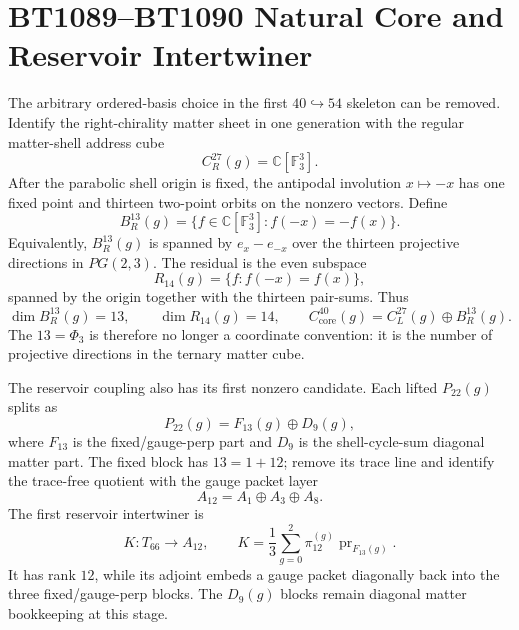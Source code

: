 \section{BT1089--BT1090 Natural Core and Reservoir Intertwiner}
\label{sec:bt1089-bt1090-natural-core-intertwiner}

The arbitrary ordered-basis choice in the first $40\hookrightarrow54$ skeleton can be removed.  Identify the right-chirality matter sheet in one generation with the regular matter-shell address cube
\[
C^{27}_R(g)=\mathbb C[\mathbb F_3^3].
\]
After the parabolic shell origin is fixed, the antipodal involution $x\mapsto -x$ has one fixed point and thirteen two-point orbits on the nonzero vectors.  Define
\[
B^{13}_R(g)=\{f\in\mathbb C[\mathbb F_3^3]: f(-x)=-f(x)\}.
\]
Equivalently, $B^{13}_R(g)$ is spanned by $e_x-e_{-x}$ over the thirteen projective directions in $PG(2,3)$.  The residual is the even subspace
\[
R_{14}(g)=\{f:f(-x)=f(x)\},
\]
spanned by the origin together with the thirteen pair-sums.  Thus
\[
\dim B^{13}_R(g)=13,
\qquad
\dim R_{14}(g)=14,
\qquad
C^{40}_{\mathrm{core}}(g)=C^{27}_L(g)\oplus B^{13}_R(g).
\]
The $13=\Phi_3$ is therefore no longer a coordinate convention: it is the number of projective directions in the ternary matter cube.

The reservoir coupling also has its first nonzero candidate.  Each lifted $P_{22}(g)$ splits as
\[
P_{22}(g)=F_{13}(g)\oplus D_9(g),
\]
where $F_{13}$ is the fixed/gauge-perp part and $D_9$ is the shell-cycle-sum diagonal matter part.  The fixed block has $13=1+12$; remove its trace line and identify the trace-free quotient with the gauge packet layer
\[
A_{12}=A_1\oplus A_3\oplus A_8.
\]
The first reservoir intertwiner is
\[
K:T_{66}\to A_{12},
\qquad
K=\frac13\sum_{g=0}^2 \pi_{12}^{(g)}\operatorname{pr}_{F_{13}(g)}.
\]
It has rank $12$, while its adjoint embeds a gauge packet diagonally back into the three fixed/gauge-perp blocks.  The $D_9(g)$ blocks remain diagonal matter bookkeeping at this stage.
